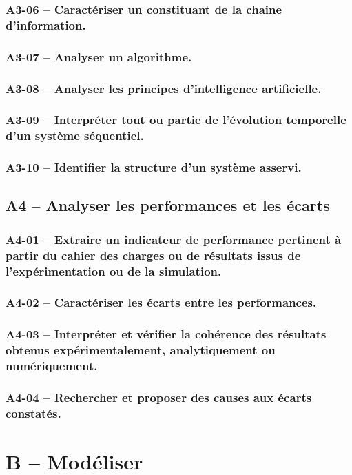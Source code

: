 \subsubsection*{A3-06 -- Caractériser un constituant de la chaine d’information.}  
\subsubsection*{A3-07 -- Analyser un algorithme. }  
\subsubsection*{A3-08 -- Analyser les principes d'intelligence artificielle. }  
\subsubsection*{A3-09 -- Interpréter tout ou partie de l’évolution temporelle d’un système séquentiel.}  
\subsubsection*{A3-10 -- Identifier la structure d'un système asservi.}  
\subsection{A4 -- Analyser les performances et les écarts}  
\subsubsection*{A4-01 -- Extraire un indicateur de performance pertinent à partir du cahier des charges ou de résultats issus de l'expérimentation ou de la simulation.}  
\subsubsection*{A4-02 -- Caractériser les écarts entre les performances.}  
\subsubsection*{A4-03 -- Interpréter et vérifier la cohérence des résultats obtenus expérimentalement, analytiquement ou numériquement. }  
\subsubsection*{A4-04 -- Rechercher et proposer des causes aux écarts constatés.}  
\section{B -- Modéliser}  
